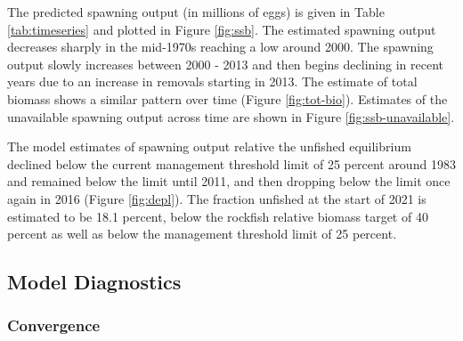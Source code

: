 \documentclass[11pt,
  english,
  a4paper,
]{article}
\begin{document}
\leavevmode\tagmcend\tagstructend


The predicted spawning output (in millions of eggs) is given in Table \ref{tab:timeseries} and plotted in Figure \ref{fig:ssb}. The estimated spawning output decreases sharply in the mid-1970s reaching a low around 2000. The spawning output slowly increases between 2000 - 2013 and then begins declining in recent years due to an increase in removals starting in 2013. The estimate of total biomass shows a similar pattern over time (Figure \ref{fig:tot-bio}). Estimates of the unavailable spawning output across time are shown in Figure \ref{fig:ssb-unavailable}.

\leavevmode\tagmcend\tagstructend\par


The model estimates of spawning output relative the unfished equilibrium declined below the current management threshold limit of 25 percent around 1983 and remained below the limit until 2011, and then dropping below the limit once again in 2016 (Figure \ref{fig:depl}). The fraction unfished at the start of 2021 is estimated to be 18.1 percent, below the rockfish relative biomass target of 40 percent as well as below the management threshold limit of 25 percent.

\leavevmode\tagmcend\tagstructend\par


\hypertarget{model-diagnostics}{%
\subsection{Model Diagnostics}\label{model-diagnostics}}

\leavevmode\tagmcend\tagstructend


\hypertarget{convergence}{%
\subsubsection{Convergence}\label{convergence}}

\leavevmode\tagmcend\tagstructend

\end{document}
